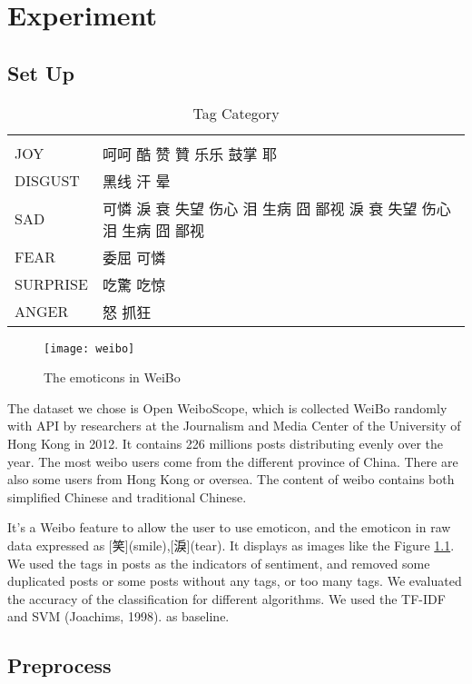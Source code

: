\chapter{Experiment}

\section{Set Up}

\begin{table}[]
\centering
\caption{Tag Category}
\label{CategoryTable}
\begin{tabular}{ll}
      &  \\
JOY  & 呵呵 酷 赞 贊 乐乐 鼓掌 耶 \\
DISGUST & 黑线 汗 晕 \\
SAD &   可憐 淚 衰 失望 伤心 泪 生病 囧 鄙视  淚 衰 失望 伤心 泪 生病 囧 鄙视  \\
FEAR &  委屈  可憐 \\
SURPRISE &  吃驚 吃惊 \\
ANGER & 怒 抓狂
\end{tabular}
\end{table}

\begin{figure}[h]
    \centering
	\texttt{[image: weibo]}
    \caption{The emoticons in WeiBo}
    \label{fig:weibo}
\end{figure}

The dataset we chose is Open WeiboScope\cite{fu2013reality}, which is collected WeiBo randomly with API by researchers at the Journalism and Media Center of the University of Hong Kong in 2012. 
It contains 226 millions posts distributing evenly over the year.  
The most weibo users come from the different province of China. There are also some users from Hong Kong or oversea. 
The content of weibo contains both simplified Chinese and traditional Chinese.

It's a Weibo feature to allow the user to use emoticon, 
and the emoticon in raw data expressed as [笑](smile),[淚](tear). It displays as images like the Figure \ref{fig:weibo}. 
We used the tags in posts as the indicators of sentiment, and removed some duplicated posts or some posts without any tags, or too many tags. 
We evaluated the accuracy of the classification for different algorithms. We used the TF-IDF and SVM (Joachims, 1998). as baseline.

\section{Preprocess}


